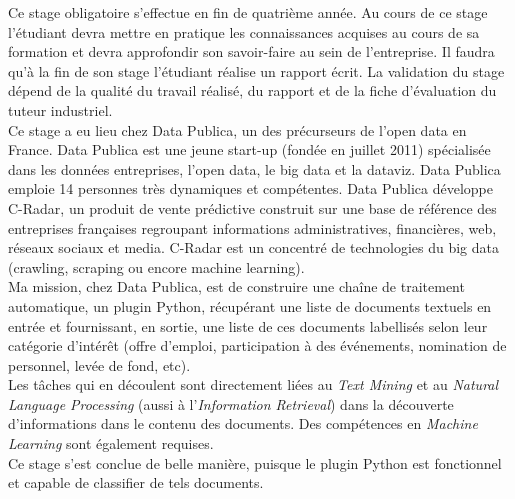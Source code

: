 Ce stage obligatoire s'effectue en fin de quatrième année. Au cours de ce stage l'étudiant devra mettre en pratique les connaissances acquises au cours de sa formation et devra approfondir son savoir-faire au sein de l'entreprise. Il faudra qu'à  la fin de son stage l'étudiant réalise un rapport écrit. La validation du stage dépend de la qualité du travail réalisé, du rapport et de la fiche d'évaluation du tuteur industriel.\\
Ce stage a eu lieu chez Data Publica, un des précurseurs de l'open data en France. Data Publica est une jeune start-up (fondée en juillet 2011) spécialisée dans les données entreprises, l'open data, le big data et la dataviz. Data Publica emploie 14 personnes très dynamiques et compétentes. Data Publica développe C-Radar, un produit de vente prédictive construit sur une base de référence des entreprises françaises regroupant informations administratives, financières, web, réseaux sociaux et media. C-Radar est un concentré de technologies du big data (crawling, scraping ou encore machine learning).\\
Ma mission, chez Data Publica, est de construire une chaîne de traitement automatique, un plugin Python, récupérant une liste de documents textuels en entrée et fournissant, en sortie, une liste de ces documents labellisés selon leur catégorie d'intérêt (offre d'emploi, participation à des événements, nomination de personnel, levée de fond, etc).\\
Les tâches qui en découlent sont directement liées au \textit{Text Mining} et au \textit{Natural Language Processing} (aussi à l'\textit{Information Retrieval}) dans la découverte d'informations dans le contenu des documents. Des compétences en \textit{Machine Learning} sont également requises.\\
Ce stage s'est conclue de belle manière, puisque le plugin Python est fonctionnel et capable de classifier de tels documents.